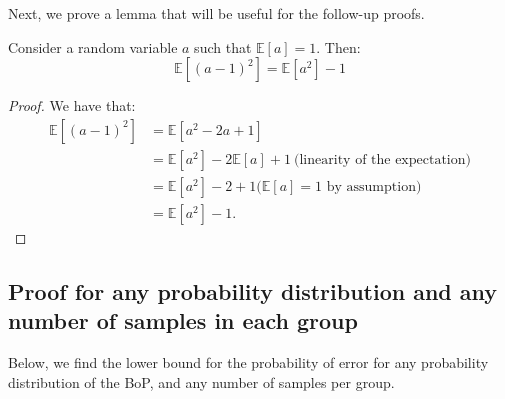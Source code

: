 Next, we prove a lemma that will be useful for the follow-up proofs.

\begin{lemma}\label{lem:expect}
    Consider a random variable $a$ such that $\mathbb{E}[a] = 1$. Then:
    \begin{equation}
        \mathbb{E}[(a - 1)^2] = \mathbb{E}[a^2] - 1
    \end{equation}
\end{lemma}

\begin{proof}
    We have that:
    \begin{align*}
        \mathbb{E}[(a - 1)^2] 
            &= \mathbb{E}[a^2 - 2a +1] \\
            &= \mathbb{E}[a^2] -2 \mathbb{E}[a] +1 
            ~\text{(linearity of the expectation)}\\
            &= \mathbb{E}[a^2] -2 +1 
            \text{($\mathbb{E}[a] = 1$ by assumption)}\\
             &= \mathbb{E}[a^2] -1. 
    \end{align*}
\end{proof}

\subsection{Proof for any probability distribution and any number of samples in each group}\label{subsec:any_distribution}

Below, we find the lower bound for the probability of error for any probability distribution of the BoP, and any number of samples per group.


